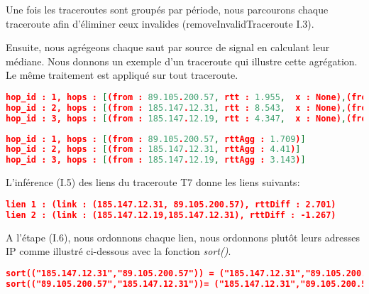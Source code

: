 Une fois les traceroutes sont groupés par période, nous parcourons chaque traceroute afin d'éliminer ceux invalides (removeInvalidTraceroute I.3). 

Ensuite, nous agrégeons chaque saut par source de signal en calculant leur médiane. Nous donnons un exemple d'un traceroute qui illustre cette agrégation. Le même traitement est appliqué sur tout traceroute. 

\begin{lstlisting}[language=json,firstnumber=1, caption={Les saut du traceroute T7 (sans agrégation)}]
hop_id : 1, hops : [(from : 89.105.200.57, rtt : 1.955,  x : None),(from : 89.105.200.57, rtt : 1.7, x : None),(from : 89.105.200.57, rtt : 1.709,  x : None)]
hop_id : 2, hops : [(from : 185.147.12.31, rtt : 8.543,  x : None),(from : 185.147.12.31, rtt : 4.103, x : None),(from : 185.147.12.31, rtt : 4.41, x : None)]
hop_id : 3, hops : [(from : 185.147.12.19, rtt : 4.347,  x : None),(from : 185.147.12.19, rtt : 2.876, x : None),(from : 185.147.12.19, rtt : 3.143, x : None )]
\end{lstlisting}

\begin{lstlisting}[language=json,firstnumber=1, caption={Les saut du traceroute T7 (après l'agrégation)}]
hop_id : 1, hops : [(from : 89.105.200.57, rttAgg : 1.709)]
hop_id : 2, hops : [(from : 185.147.12.31, rttAgg : 4.41)] 
hop_id : 3, hops : [(from : 185.147.12.19, rttAgg : 3.143)]
\end{lstlisting}

L'inférence (I.5) des liens du traceroute T7 donne les liens suivants: 

\begin{lstlisting}[language=json,firstnumber=1, caption={Exemple des liens inférés du traceroute T7}, basicstyle = \small]
lien 1 : (link : (185.147.12.31, 89.105.200.57), rttDiff : 2.701)
lien 2 : (link : (185.147.12.19,185.147.12.31), rttDiff : -1.267)
\end{lstlisting}


A l'étape (I.6), nous ordonnons chaque lien, nous ordonnons plutôt leurs adresses IP comme illustré ci-dessous avec la fonction \textit{sort()}. 

\begin{lstlisting}[language=json,firstnumber=1, caption={Illustration de l'ordre des liens}, basicstyle = \footnotesize]
sort(("185.147.12.31","89.105.200.57")) = ("185.147.12.31","89.105.200.57")
sort(("89.105.200.57","185.147.12.31"))= ("185.147.12.31","89.105.200.57")   
\end{lstlisting}

